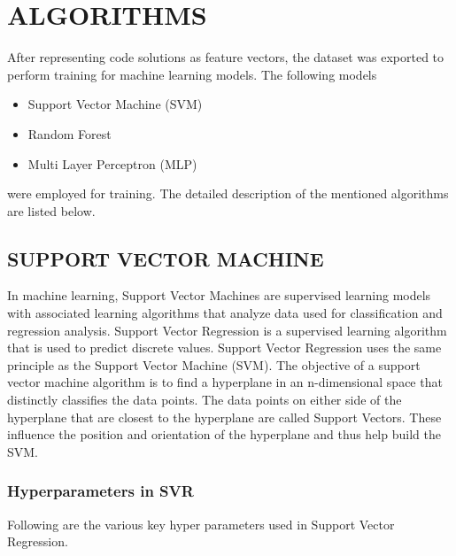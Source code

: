 
\chapter{ALGORITHMS} %

After representing code solutions as feature vectors, the dataset was exported to perform training for machine learning models. The following models 

\begin{itemize}
    \item Support Vector Machine (SVM)
    \item Random Forest 
    \item Multi Layer Perceptron (MLP)
\end{itemize}

were employed for training. The detailed description of the mentioned algorithms are listed below. 

\section{SUPPORT VECTOR MACHINE}

In machine learning, Support Vector Machines are supervised learning models with associated learning algorithms that analyze data used for classification and regression analysis. Support Vector Regression \cite{D} is a supervised learning algorithm that is used to predict discrete values. Support Vector Regression uses the same principle as the Support Vector Machine (SVM). The objective of a support vector machine algorithm is to find a hyperplane in an n-dimensional space that distinctly classifies the data points. The data points on either side of the hyperplane that are closest to the hyperplane are called Support Vectors. These influence the position and orientation of the hyperplane and thus help build the SVM.

\subsection{Hyperparameters in SVR}

Following are the various key hyper parameters used in Support Vector Regression.

